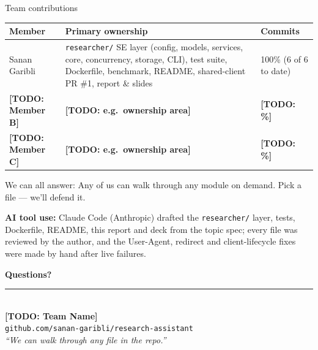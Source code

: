 \documentclass[aspectratio=169,11pt]{beamer}
\newcommand{\TODO}[1]{\textcolor{accent2}{\textbf{[TODO: #1]}}}
\newcommand{\teamname}{\TODO{Team Name}}
\newcommand{\memberone}{Sanan Garibli}
\newcommand{\membertwo}{\TODO{Member B}}
\newcommand{\memberthree}{\TODO{Member C}}
\newcommand{\repolink}{github.com/sanan-garibli/research-assistant}
\begin{document}
\begin{frame}{Team contributions}
  \begin{center}\small
  \begin{tabularx}{\linewidth}{lXl}
    \toprule
    \textbf{Member} & \textbf{Primary ownership} & \textbf{Commits} \\
    \midrule
    \memberone   & \texttt{researcher/} SE layer (config, models, services, core, concurrency, storage, CLI), test suite, Dockerfile, benchmark, README, shared-client PR \#1, report \& slides & 100\% (6 of 6 to date) \\
    \membertwo   & \TODO{e.g.\ ownership area}   & \TODO{\%} \\
    \memberthree & \TODO{e.g.\ ownership area}   & \TODO{\%} \\
    \bottomrule
  \end{tabularx}
  \end{center}

  \vspace{0.4em}
  \begin{block}{We can all answer:}
    Any of us can walk through any module on demand. Pick a file --- we'll defend it.
  \end{block}

  \vspace{0.4em}
  \textbf{AI tool use:} Claude Code (Anthropic) drafted the \texttt{researcher/} layer, tests, Dockerfile, README, this report and deck from the topic spec; every file was reviewed by the author, and the User-Agent, redirect and client-lifecycle fixes were made by hand after live failures.
\end{frame}

{%
\begin{frame}[plain]
  \begin{center}
    \vspace{1cm}
    {\Huge\bfseries\color{accent} Questions?}\\[1.2em]
    \rule{0.5\textwidth}{0.6pt}\\[1.2em]
    {\large \teamname}\\[0.6em]
    {\normalsize \texttt{\repolink}}\\[1cm]
    {\footnotesize\itshape ``We can walk through any file in the repo.''}
  \end{center}
\end{frame}
}
\end{document}
